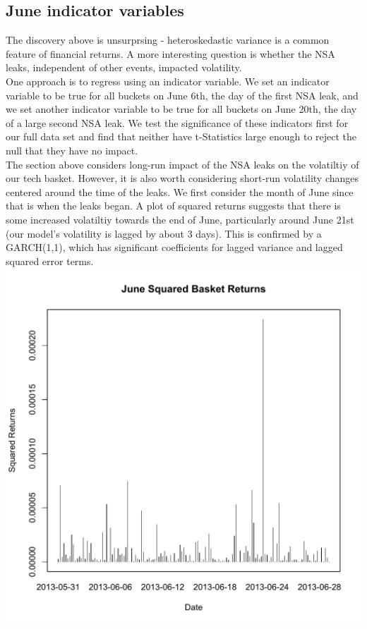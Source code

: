 \documentclass[11pt]{amsart}
\begin{document}
\newpage
\subsection{June indicator variables}

The discovery above is unsurprsing - heteroskedastic variance is a common feature of financial returns. A more interesting question is whether the NSA leaks, independent of other events, impacted volatility. \\

One approach is to regress using an indicator variable. We set an indicator variable to be true for all buckets on June 6th, the day of the first NSA leak, and we set another indicator variable to be true for all buckets on June 20th, the day of a large second NSA leak. We test the significance of these indicators first for our full data set and find that neither have t-Statistics large enough to reject the null that they have no impact. \\

The section above considers long-run impact of the NSA leaks on the volatiltiy of our tech basket. However, it is
also worth considering short-run volatility changes centered around the time of the leaks. We first consider the month of June since that is when the leaks began. A plot of squared returns suggests that there is some increased volatiltiy towards the end of June, particularly around June 21st (our model's volatility is lagged by about 3 days). This is confirmed by a GARCH(1,1), which has significant coefficients for lagged variance and lagged squared error terms. \\

\includegraphics[scale=0.6]{june_squared_basket_ret.pdf} \\
\end{document}
